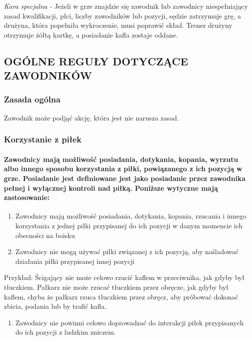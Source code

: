 \documentclass[12pt]{article}
\begin{document}
\emph{Kara specjalna -} Jeżeli w grze znajdzie się zawodnik lub
zawodnicy niespełniający zasad kwalifikacji, płci, liczby zawodników lub
pozycji, sędzie zatrzymuje grę, a drużyna, która popełniła wykroczenie,
musi poprawić skład. Trener drużyny otrzymuje żółtą kartkę, a posiadanie
kafla zostaje oddane.

\subsection{OGÓLNE REGUŁY DOTYCZĄCE ZAWODNIKÓW}

\subsubsection{Zasada ogólna}

Zawodnik może podjąć akcję, która jest nie narusza zasad.

\subsubsection{Korzystanie z piłek}

\paragraph{Zawodnicy mają możliwość posiadania, dotykania,
	kopania, wyrzutu albo innego sposobu korzystania z piłki, powiązanego z
	ich pozycją w grze. Posiadanie jest definiowane jest jako posiadanie
	przez zawodnika pełnej i wyłącznej kontroli nad piłką. Poniższe wytyczne
	mają zastosowanie:}

\begin{enumerate}
	\item
	      Zawodnicy mają możliwość posiadania, dotykania, kopania, rzucania i
	      innego korzystania z jednej piłki przypisanej do ich pozycji w danym
	      momencie ich obecności na boisku
	\item
	      Zawodnicy nie mogą używać piłki związanej z ich pozycją, aby
	      naśladować działania piłki przypisanej innej pozycji
\end{enumerate}

Przykład: Ścigający nie może celowo rzucić kaflem w
przeciwnika, jak gdyby był tłuczkiem. Pałkarz nie może rzucać tłuczkiem
przez obręcze, jak gdyby był kaflem, chyba że pałkarz rzuca tłuczkiem
przez obręcz, aby próbować dokonać zbicia, podania lub by trafić kafla.

\begin{enumerate}[resume]
	\item Zawodnicy nie powinni celowo doprowadzać do interakcji piłek
	      przypisanych do ich pozycji z ludzkim zniczem.
\end{enumerate}
\end{document}
